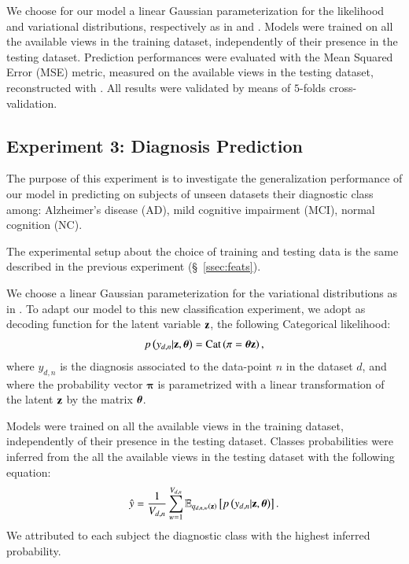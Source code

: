 We choose for our model a linear Gaussian parameterization for the likelihood and variational distributions, respectively as in  and .
Models were trained on all the available views in the training dataset, independently of their presence in the testing dataset.
Prediction performances were evaluated with the Mean Squared Error (MSE) metric, measured on the available views in the testing dataset, reconstructed with .
All results were validated by means of $5$-folds cross-validation.

\subsection{Experiment 3: Diagnosis Prediction}


The purpose of this experiment is to investigate the generalization performance of our model in predicting on subjects of unseen datasets their diagnostic class among:
Alzheimer's disease (AD),
mild cognitive impairment (MCI),
normal cognition (NC).

The experimental setup about the choice of training and testing data is the same described in the previous experiment (\S~\ref{ssec:feats}).

We choose a linear Gaussian parameterization for the variational distributions as in .
To adapt our model to this new classification experiment, we adopt as decoding function for the latent variable $\mathbf{z}$, the following Categorical likelihood:
\begin{align}
\label{eq:classifier}
p\left(y_{d,n}|\mathbf{z},\boldsymbol{\theta}\right) = \operatorname{Cat}\left(\mathbf{\pi}=\boldsymbol{\theta}\mathbf{z}\right),
\end{align}
where $y_{d,n}$ is the diagnosis associated to the data-point $n$ in the dataset $d$, and where the probability vector $\mathbf{\pi}$ is parametrized with a linear transformation of the latent $\mathbf{z}$ by the matrix $\boldsymbol{\theta}$.

Models were trained on all the available views in the training dataset, independently of their presence in the testing dataset.
Classes probabilities were inferred from the all the available views in the testing dataset with the following equation:
\begin{equation}\label{eq:reconstructiony}
\begin{aligned}
\hat y = \frac{1}{V_{d, n}} \sum_{w=1}^{V_{d, n}} \operatorname{\mathbb{E}}_{q_{d,n,w}(\mathbf{z})}\left[p\left(y_{d,n}|\mathbf{z},\boldsymbol{\theta}\right)\right].
\end{aligned}
\end{equation}
We attributed to each subject the diagnostic class with the highest inferred probability.


